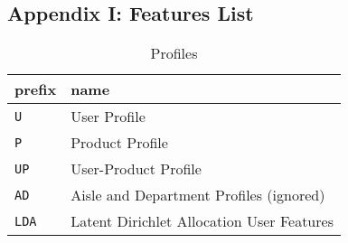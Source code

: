 \documentclass[11pt]{article}
\theoremstyle{definition}
\numberwithin{equation}{section}
\begin{document}
\hypertarget{appendix-i-features-list}{%
  \subsection{Appendix I: Features List}\label{appendix-i-features-list}}

\begin{longtable}[]{@{}ll@{}}
\caption[]{Profiles}\label{tbl:profiles} \\
  \toprule
  prefix       & name\tabularnewline
  \midrule
  \endhead
  \texttt{U}   & User Profile\tabularnewline
  \texttt{P}   & Product Profile\tabularnewline
  \texttt{UP}  & User-Product Profile\tabularnewline
  \texttt{AD}  & Aisle and Department Profiles (ignored)\tabularnewline
  \texttt{LDA} & Latent Dirichlet Allocation User Features\tabularnewline
  \bottomrule
\end{longtable}
\end{document}
